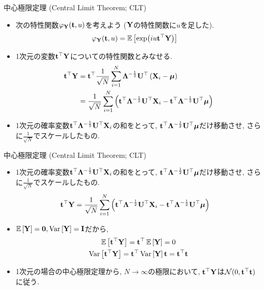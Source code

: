 \documentclass[dvipdfmx,notheorems,t]{beamer}
\begin{document}
\begin{frame}{中心極限定理 (Central Limit Theorem; CLT)}
\begin{itemize}
  \item 次の特性関数$\varphi_{\vb{Y}}(\vb{t}, u)$を考えよう ($\vb{Y}$の特性関数に$u$を足した).
  \begin{align*}
    \varphi_{\vb{Y}}(\vb{t}, u) &= \operatorname{\mathbb{E}} \left[ \exp(iu \vb{t}^\top \vb{Y}) \right]
  \end{align*}
  \item 1次元の変数$\vb{t}^\top \vb{Y}$についての特性関数とみなせる.
  \begin{align*}
    \vb{t}^\top \vb{Y} &= \vb{t}^\top \frac{1}{\sqrt{N}} \sum_{i = 1}^N
      \vb{\Lambda}^{-\frac{1}{2}} \vb{U}^\top \left( \vb{X}_i - \vb*{\mu} \right) \\
      &= \frac{1}{\sqrt{N}} \sum_{i = 1}^N \left(
      \vb{t}^\top \vb{\Lambda}^{-\frac{1}{2}} \vb{U}^\top \vb{X}_i
      - \vb{t}^\top \vb{\Lambda}^{-\frac{1}{2}} \vb{U}^\top \vb*{\mu} \right)
  \end{align*}
  \item 1次元の確率変数$\vb{t}^\top \vb{\Lambda}^{-\frac{1}{2}} \vb{U}^\top \vb{X}_i$の和をとって,
  $\vb{t}^\top \vb{\Lambda}^{-\frac{1}{2}} \vb{U}^\top \vb*{\mu}$だけ移動させ,
  さらに$\frac{1}{\sqrt{N}}$でスケールしたもの.
\end{itemize}
\end{frame}

\begin{frame}{中心極限定理 (Central Limit Theorem; CLT)}
\begin{itemize}
  \item 1次元の確率変数$\vb{t}^\top \vb{\Lambda}^{-\frac{1}{2}} \vb{U}^\top \vb{X}_i$の和をとって,
  $\vb{t}^\top \vb{\Lambda}^{-\frac{1}{2}} \vb{U}^\top \vb*{\mu}$だけ移動させ,
  さらに$\frac{1}{\sqrt{N}}$でスケールしたもの.
  \begin{align*}
    \vb{t}^\top \vb{Y} &= \frac{1}{\sqrt{N}} \sum_{i = 1}^N \left(
      \vb{t}^\top \vb{\Lambda}^{-\frac{1}{2}} \vb{U}^\top \vb{X}_i
      - \vb{t}^\top \vb{\Lambda}^{-\frac{1}{2}} \vb{U}^\top \vb*{\mu} \right)
  \end{align*}
  \item $\operatorname{\mathbb{E}} \left[ \vb{Y} \right] = \vb{0}, \operatorname{Var} \left[ \vb{Y} \right] = \vb{I}$だから,
  \begin{gather*}
    \operatorname{\mathbb{E}} \left[ \vb{t}^\top \vb{Y} \right] = \vb{t}^\top \operatorname{\mathbb{E}} \left[ \vb{Y} \right] = 0 \\
    \operatorname{Var} \left[ \vb{t}^\top \vb{Y} \right] = \vb{t}^\top \operatorname{Var} \left[ \vb{Y} \right] \vb{t} = \vb{t}^\top \vb{t}
  \end{gather*}
  \item 1次元の場合の中心極限定理から, $N \to \infty$の極限において,
  $\vb{t}^\top \vb{Y}$は$\mathcal{N}(0, \vb{t}^\top \vb{t})$に従う.
\end{itemize}
\end{frame}
\end{document}
